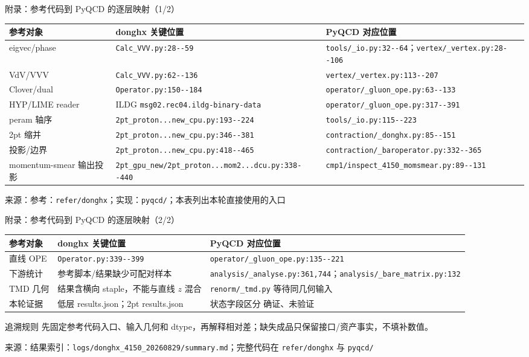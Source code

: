 \documentclass[UTF8,aspectratio=169,11pt]{ctexbeamer}
\newcommand{\source}[1]{\vspace{0.05em}\par{\raggedright\scriptsize\color{muted}来源：#1\par}}
\newcommand{\codepath}[1]{\nolinkurl{#1}}
\newcommand{\verified}{\textcolor{evidence}{确证}}
\newcommand{\unverified}{\textcolor{warning}{未验证}}
\begin{document}
\begin{frame}[t]{附录：参考代码到 PyQCD 的逐层映射（1/2）}
  \footnotesize
  \setlength{\tabcolsep}{3pt}
  \renewcommand{\arraystretch}{1.00}
  \begin{tabularx}{0.96\textwidth}{@{}L Y Y@{}}
    \toprule
    参考对象 & donghx 关键位置 & PyQCD 对应位置\\
    \midrule
    eigvec/phase & \codepath{Calc_VVV.py:28--59} & \codepath{tools/_io.py:32--64}；\codepath{vertex/_vertex.py:28--106}\\
    VdV/VVV & \codepath{Calc_VVV.py:62--136} & \codepath{vertex/_vertex.py:113--207}\\
    Clover/dual & \codepath{Operator.py:150--184} & \codepath{operator/_gluon_ope.py:63--133}\\
    HYP/LIME reader & ILDG \codepath{msg02.rec04.ildg-binary-data} & \codepath{operator/_gluon_ope.py:317--391}\\
    peram 轴序 & \codepath{2pt_proton...new_cpu.py:193--224} & \codepath{tools/_io.py:115--223}\\
    2pt 缩并 & \codepath{2pt_proton...new_cpu.py:346--381} & \codepath{contraction/_donghx.py:85--151}\\
    投影/边界 & \codepath{2pt_proton...new_cpu.py:418--465} & \codepath{contraction/_baroperator.py:332--365}\\
    momentum-smear 输出投影 & \codepath{2pt_gpu_new/2pt_proton...mom2...dcu.py:338--440} & \codepath{cmp1/inspect_4150_momsmear.py:89--131}\\
    \bottomrule
  \end{tabularx}
  \source{参考：\codepath{refer/donghx}；实现：\codepath{pyqcd/}；本表列出本轮直接使用的入口}
\end{frame}

\begin{frame}[t]{附录：参考代码到 PyQCD 的逐层映射（2/2）}
  \footnotesize
  \setlength{\tabcolsep}{3pt}
  \renewcommand{\arraystretch}{1.00}
  \begin{tabularx}{0.96\textwidth}{@{}L Y Y@{}}
    \toprule
    参考对象 & donghx 关键位置 & PyQCD 对应位置\\
    \midrule
    直线 OPE & \codepath{Operator.py:339--399} & \codepath{operator/_gluon_ope.py:135--221}\\
    下游统计 & 参考脚本/结果缺少可配对样本 & \codepath{analysis/_analyse.py:361,744}；\codepath{analysis/_bare_matrix.py:132}\\
    TMD 几何 & 结果含横向 staple，不能与直线 $z$ 混合 & \codepath{renorm/_tmd.py} 等待同几何输入\\
    本轮证据 & 低层 results.json；2pt results.json & 状态字段区分 \verified、\unverified\\
    \bottomrule
  \end{tabularx}
  \vspace{0.12em}
  \begin{block}{追溯规则}
    先固定参考代码入口、输入几何和 dtype，再解释相对差；缺失成品只保留接口/资产事实，不填补数值。
  \end{block}
  \source{结果索引：\codepath{logs/donghx_4150_20260829/summary.md}；完整代码在 \codepath{refer/donghx} 与 \codepath{pyqcd/}}
\end{frame}
\end{document}
